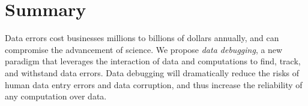 \section{Summary}


Data errors cost businesses millions to billions of dollars annually,
and can compromise the advancement of science. We propose \emph{data
  debugging}, a new paradigm that leverages the interaction of data
and computations to find, track, and withstand data errors. Data
debugging will dramatically reduce the risks of human data entry
errors and data corruption, and thus increase the reliability of any
computation over data.


